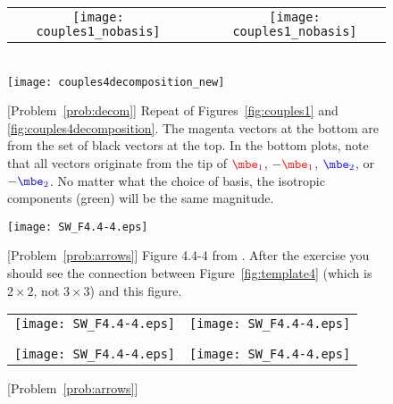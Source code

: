 \documentclass[11pt,titlepage,fleqn]{article}
\newcommand{\eone}{\textcolor{red}{\mbe_1}}
\newcommand{\etwo}{\textcolor{blue}{\mbe_2}}
\begin{document}
\begin{figure}
\centering
\begin{tabular}{ccc}
\texttt{[image: couples1\_nobasis]}
& \hspace{1.4cm} &
\texttt{[image: couples1\_nobasis]}
\end{tabular}
\\
\makebox{\hspace{0.5cm}}
\texttt{[image: couples4decomposition\_new]}
\caption{
[Problem~\ref{prob:decom}]
Repeat of Figures~\ref{fig:couples1} and \ref{fig:couples4decomposition}.
The magenta vectors at the bottom are from the set of black vectors at the top.
In the bottom plots, note that all vectors originate from the tip of $\eone$, $-\eone$, $\etwo$, or $-\etwo$.
No matter what the choice of basis, the isotropic components (green) will be the same magnitude.
\label{fig:decom}
}
\end{figure}


\begin{figure}
\centering
\texttt{[image: SW\_F4.4-4.eps]}
\caption{
[Problem~\ref{prob:arrows}]
Figure 4.4-4 from \citet{SteinWysession}.
After the exercise you should see the connection between Figure~\ref{fig:template4} (which is $2 \times 2$, not $3 \times 3$) and this figure.
\label{fig:SW}
}
\end{figure}

\begin{figure}
\hspace{-1cm}
\begin{tabular}{c|c}
\texttt{[image: SW\_F4.4-4.eps]} & \texttt{[image: SW\_F4.4-4.eps]} \\
& \\ \hline
& \\
\texttt{[image: SW\_F4.4-4.eps]} & \texttt{[image: SW\_F4.4-4.eps]} 
\end{tabular}
\caption{
[Problem~\ref{prob:arrows}]
\label{fig:SWfour}
}
\end{figure}

\end{document}
